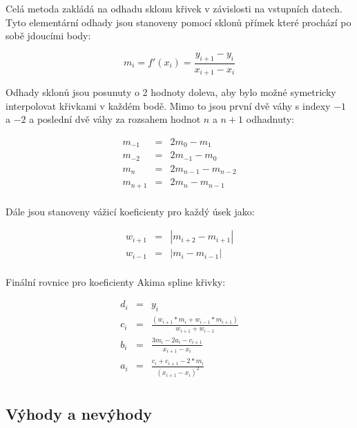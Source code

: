 \documentclass[]{thesiskiv}
\begin{document}
Celá metoda zakládá na odhadu sklonu křivek v závislosti na vstupních datech. Tyto elementární odhady jsou stanoveny pomocí sklonů přímek které prochází po sobě jdoucími body:

\begin{equation}
m_{i} = f'(x_{i})=\frac{y_{i+1} - y_i}{x_{i+1} - x_i}
\end{equation}

Odhady sklonů jsou posunuty o 2 hodnoty doleva, aby bylo možné symetricky interpolovat křivkami v každém bodě. Mimo to jsou první dvě váhy s indexy $-1$ a $-2$ a poslední dvě váhy za rozsahem hodnot $n$ a $n+1$ odhadnuty:

\begin{equation}
\begin{array}{rcl}
    m_{-1} & = & 2 m_0 - m_1 \\
    m_{-2} & = & 2 m_{-1} - m_0 \\
    m_{n}  & = & 2 m_{n-1} - m_{n-2} \\
    m_{n+1} & = & 2 m_{n} - m_{n-1} \\
\end{array}
\end{equation}

Dále jsou stanoveny vážicí koeficienty pro každý úsek jako:

\begin{equation}
\begin{array}{rcl}
 w_{i+1} & = & |m_{i+2} - m_{i+1}| \\
 w_{i-1} & = & |m_{i} - m_{i-1}| \\
\end{array}
\end{equation}

Finální rovnice pro koeficienty Akima spline křivky:

\begin{equation}
\begin{array}{rcl}
 d_i & = & y_i \\
 c_i & = & \frac{(w_{i+1} * m_i + w_{i-1} * m_{i+1})}{w_{i+1} + w_{i-1}} \\
 b_i & = & \frac{3 m_i - 2 a_i - c_{i+1}}{x_{i+1} - x_i} \\
 a_i & = & \frac{c_i + c_{i+1} - 2 * m_i}{(x_{i+1} - x_i)^2}\\
\end{array}
\end{equation}

\subsection*{Výhody a nevýhody}
\end{document}
